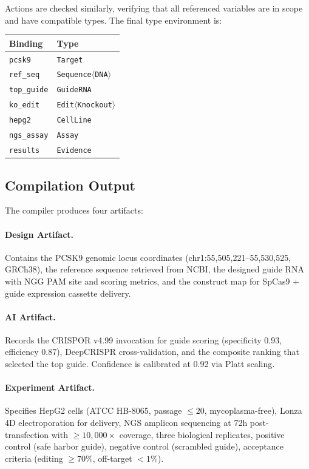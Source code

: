 \documentclass[12pt,a4paper]{article}
\newcommand{\ty}[1]{\texttt{#1}}
\begin{document}
Actions are checked similarly, verifying that all referenced variables are in scope and have compatible types. The final type environment is:

\begin{center}
\begin{tabular}{ll}
\toprule
\textbf{Binding} & \textbf{Type} \\
\midrule
\texttt{pcsk9} & \ty{Target} \\
\texttt{ref\_seq} & \ty{Sequence$\langle$DNA$\rangle$} \\
\texttt{top\_guide} & \ty{GuideRNA} \\
\texttt{ko\_edit} & \ty{Edit$\langle$Knockout$\rangle$} \\
\texttt{hepg2} & \ty{CellLine} \\
\texttt{ngs\_assay} & \ty{Assay} \\
\texttt{results} & \ty{Evidence} \\
\bottomrule
\end{tabular}
\end{center}

\subsection{Compilation Output}

The compiler produces four artifacts:

\paragraph{Design Artifact.} Contains the PCSK9 genomic locus coordinates (chr1:55,505,221--55,530,525, GRCh38), the reference sequence retrieved from NCBI, the designed guide RNA with NGG PAM site and scoring metrics, and the construct map for SpCas9 + guide expression cassette delivery.

\paragraph{AI Artifact.} Records the CRISPOR v4.99 invocation for guide scoring (specificity 0.93, efficiency 0.87), DeepCRISPR cross-validation, and the composite ranking that selected the top guide. Confidence is calibrated at 0.92 via Platt scaling.

\paragraph{Experiment Artifact.} Specifies HepG2 cells (ATCC HB-8065, passage $\leq 20$, mycoplasma-free), Lonza 4D electroporation for delivery, NGS amplicon sequencing at 72h post-transfection with $\geq 10{,}000\times$ coverage, three biological replicates, positive control (safe harbor guide), negative control (scrambled guide), acceptance criteria (editing $\geq 70\%$, off-target $< 1\%$).
\end{document}
